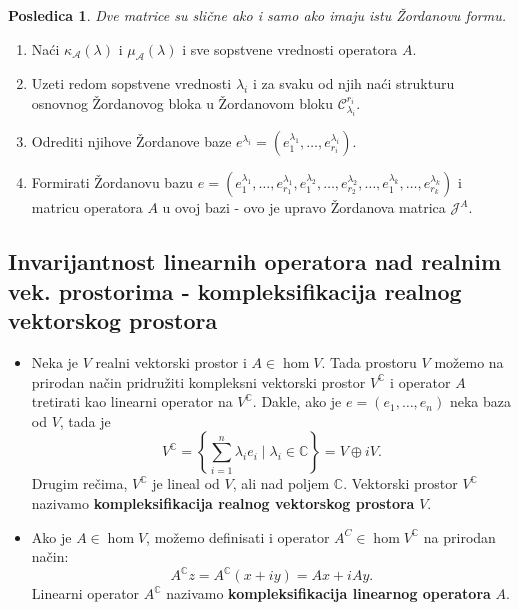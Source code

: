 \documentclass[a4paper,12pt,twoside]{report}
\newtheorem{corollary}{Posledica}[theorem]
\numberwithin{algorithm}{section}
\begin{document}
\begin{corollary}
    Dve matrice su slične ako i samo ako imaju istu Žordanovu formu.
\end{corollary}

\begin{algorithm}[!h]
    \caption{Određivanje Žordanove forme matrice operatora}
    \begin{enumerate}
        \item Naći $\kappa_\mathcal{A}(\lambda)$ i $\mu_\mathcal{A}(\lambda)$ i sve sopstvene vrednosti operatora $A$.
        \item Uzeti redom sopstvene vrednosti $\lambda_i$ i za svaku od njih naći strukturu osnovnog Žordanovog bloka u Žordanovom bloku $\mathcal{C}_{\lambda_i}^{r_i}$.
        \item Odrediti njihove Žordanove baze $e^{\lambda_i} = (e_1^{\lambda_1}, \dots, e_{r_i}^{\lambda_i})$.
        \item Formirati Žordanovu bazu $e = (e_{1}^{\lambda_1}, \dots, e_{r_1}^{\lambda_1}, e_{1}^{\lambda_2}, \dots, e_{r_2}^{\lambda_2}, \dots, e_{1}^{\lambda_k}, \dots, e_{r_k}^{\lambda_k})$ i 
        matricu operatora $A$ u ovoj bazi - ovo je upravo Žordanova matrica $\mathcal{J}^A$.
    \end{enumerate}

    
\end{algorithm}

\newpage
\subsection{Invarijantnost linearnih operatora nad realnim vek. prostorima - kompleksifikacija realnog vektorskog prostora}

\begin{itemize}
    \item Neka je $V$ realni vektorski prostor i $A \in \hom V$. Tada prostoru $V$ možemo na prirodan način pridružiti kompleksni vektorski prostor $V^\mathbb{C}$ i 
    operator $A$ tretirati kao linearni operator na $V^{\mathbb{C}}$. Dakle, ako je $e = (e_1, \dots, e_n)$ neka baza od $V$,  tada je
    \[ V^\mathbb{C} = \left\{ \sum_{i=1}^{n} \lambda_i e_i \;|\; \lambda_i \in \mathbb{C} \right\} = V \oplus iV. \]
    Drugim rečima, $V^\mathbb{C}$ je lineal od $V$, ali nad poljem $\mathbb{C}$. Vektorski prostor $V^\mathbb{C}$ nazivamo \textbf{kompleksifikacija realnog vektorskog prostora} $V$.
    \item Ako je $A \in \hom V$, možemo definisati i operator $A^C \in \hom V^\mathbb{C}$ na prirodan način:
    \[ A^\mathbb{C}z = A^\mathbb{C}(x + iy) = Ax + iAy. \]
    Linearni operator $A^\mathbb{C}$ nazivamo \textbf{kompleksifikacija linearnog operatora} $A$.
\end{itemize}
\end{document}
